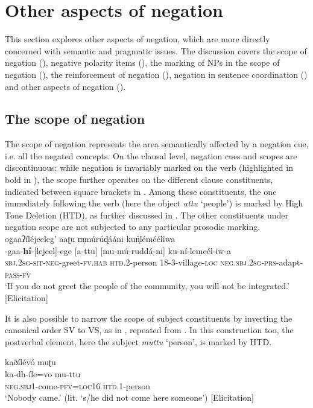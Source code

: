 \documentclass[output=paper,colorlinks=true, citecolor=brown,draftmode]{langscibook}
\begin{document}
\section{Other aspects of negation}\label{sec:cuw:4}
This section explores other aspects of negation, which are more directly concerned with semantic and pragmatic issues. The discussion covers the scope of negation (), negative polarity items (), the marking of NPs in the scope of negation (), the reinforcement of negation (), negation in sentence coordination () and other aspects of negation ().

\subsection{The scope of negation}\label{sec:cuw:4.1}
The scope of negation represents the area semantically affected by a negation cue, i.e. all the negated concepts. On the clausal level, negation cues and scopes are discontinuous: while negation is invariably marked on the verb (highlighted in bold in ), the scope further operates on the different clause constituents, indicated between square brackets in . Among these constituents, the one immediately following the verb (here the object \textit{attu} ‘people’) is marked by High Tone Deletion (HTD), as further discussed in . The other constituents under negation scope are not subjected to any particular prosodic marking. 
\newpage
\ea\label{ex:cuw:67} ogaaʔíléjeeleg’ aaʈu m̩múrúɖááni kuń̩léméélîwa\\ 
    \gll  [o]-gaa-\textbf{hí}{}-[lejeel]-ege [a-ttu] [mu-mú-ruddá-ni] ku-ní-lemeél-iw-a \\ 
          \textsc{sbj.2sg-sit-neg-}greet-\textsc{fv.hab} \textsc{htd.2-}person 18-3-village-\textsc{loc} \textsc{neg.sbj.2sg-prs-}adapt-\textsc{pass-fv} \\
    \glt ‘If you do not greet the people of the community, you will not be integrated.’ [Elicitation]
\z 

It is also possible to narrow the scope of subject constituents by inverting the canonical order SV to VS, as in , repeated from . In this construction too, the postverbal element, here the subject \textit{muttu} ‘person’, is marked by HTD. 

\ea\label{ex:cuw:68} kaðílévó muʈu  \\ 
    \gll  ka-dh-íle=vo mu-ttu \\
          \textsc{neg.sbj1}-come-\textsc{pfv=loc16} \textsc{htd.1}{}-person\\
    \glt ‘Nobody came.’ (lit. ‘s/he did not come here someone’) [Elicitation]
\end{document}
